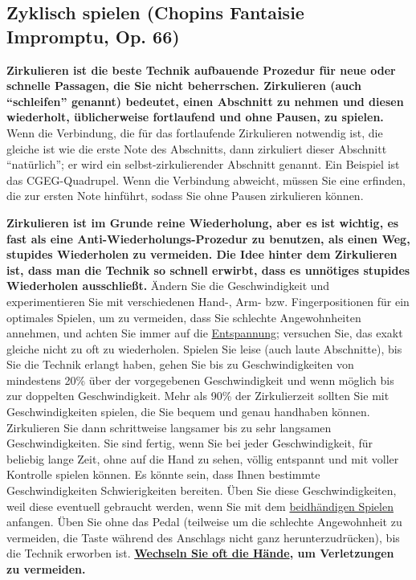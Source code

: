 
\subsection{Zyklisch spielen (Chopins Fantaisie Impromptu, Op. 66)}
\label{c1iii2}

\textbf{Zirkulieren ist die beste Technik aufbauende Prozedur für neue oder schnelle Passagen, die Sie nicht beherrschen.
Zirkulieren (auch \enquote{schleifen} genannt) bedeutet, einen Abschnitt zu nehmen und diesen wiederholt, üblicherweise fortlaufend und ohne Pausen, zu spielen.}
Wenn die Verbindung, die für das fortlaufende Zirkulieren notwendig ist, die gleiche ist wie die erste Note des Abschnitts, dann zirkuliert dieser Abschnitt \enquote{natürlich}; er wird ein selbst-zirkulierender Abschnitt genannt.
Ein Beispiel ist das CGEG-Quadrupel.
Wenn die Verbindung abweicht, müssen Sie eine erfinden, die zur ersten Note hinführt, sodass Sie ohne Pausen zirkulieren können.

\textbf{Zirkulieren ist im Grunde reine Wiederholung, aber es ist wichtig, es fast als eine Anti-Wiederholungs-Prozedur zu benutzen, als einen Weg, stupides Wiederholen zu vermeiden.
Die Idee hinter dem Zirkulieren ist, dass man die Technik so schnell erwirbt, dass es unnötiges stupides Wiederholen ausschließt.}
Ändern Sie die Geschwindigkeit und experimentieren Sie mit verschiedenen Hand-, Arm- bzw. Fingerpositionen für ein optimales Spielen, um zu vermeiden, dass Sie schlechte Angewohnheiten annehmen, und achten Sie immer auf die \hyperref[c1ii14]{Entspannung}; versuchen Sie, das exakt gleiche nicht zu oft zu wiederholen.
Spielen Sie leise (auch laute Abschnitte), bis Sie die Technik erlangt haben, gehen Sie bis zu Geschwindigkeiten von mindestens 20\% über der vorgegebenen Geschwindigkeit und wenn möglich bis zur doppelten Geschwindigkeit.
Mehr als 90\% der Zirkulierzeit sollten Sie mit Geschwindigkeiten spielen, die Sie bequem und genau handhaben können.
Zirkulieren Sie dann schrittweise langsamer bis zu sehr langsamen Geschwindigkeiten.
Sie sind fertig, wenn Sie bei jeder Geschwindigkeit, für beliebig lange Zeit, ohne auf die Hand zu sehen, völlig entspannt und mit voller Kontrolle spielen können.
Es könnte sein, dass Ihnen bestimmte Geschwindigkeiten Schwierigkeiten bereiten.
Üben Sie diese Geschwindigkeiten, weil diese eventuell gebraucht werden, wenn Sie mit dem \hyperref[c1ii25]{beidhändigen Spielen} anfangen.
Üben Sie ohne das Pedal (teilweise um die schlechte Angewohnheit zu vermeiden, die Taste während des Anschlags nicht ganz herunterzudrücken), bis die Technik erworben ist.
\textbf{\hyperref[c1ii7]{Wechseln Sie oft die Hände}, um Verletzungen zu vermeiden.}

